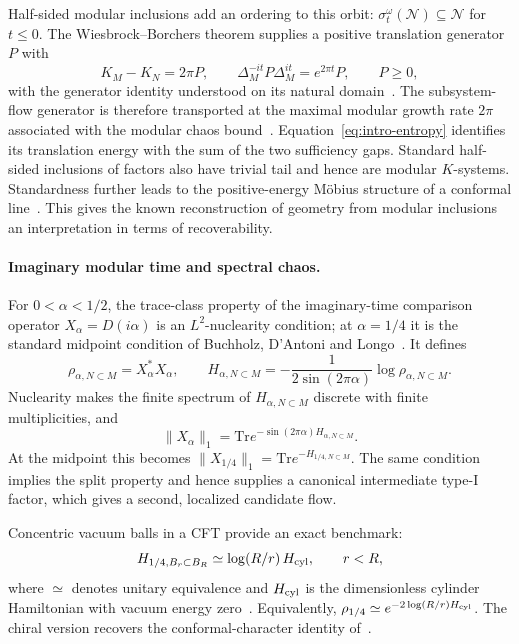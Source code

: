\documentclass[a4paper,11pt]{article}
\theoremstyle{definition}
\newcommand{\Tr}{\text{Tr}}
\begin{document}
Half-sided modular inclusions add an ordering to this orbit: $\sigma_t^\omega(\mathcal N)\subseteq\mathcal N$ for $t\le0$. The Wiesbrock--Borchers theorem supplies a positive translation generator $P$ with
\begin{equation}
 K_M-K_N=2\pi P,
 \qquad
 \Delta_M^{-it}P\Delta_M^{it}=e^{2\pi t}P,
 \qquad P\ge0,
\end{equation}
with the generator identity understood on its natural domain~\cite{Wiesbrock1993,Borchers1992,ArakiZsido2005}. The subsystem-flow generator is therefore transported at the maximal modular growth rate $2\pi$ associated with the modular chaos bound~\cite{deBoerLamprou2020}. Equation~\eqref{eq:intro-entropy} identifies its translation energy with the sum of the two sufficiency gaps. Standard half-sided inclusions of factors also have trivial tail and hence are modular $K$-systems. Standardness further leads to the positive-energy M\"obius structure of a conformal line~\cite{Wiesbrock1993b,GuidoLongoWiesbrock1998}. This gives the known reconstruction of geometry from modular inclusions an interpretation in terms of recoverability.

\paragraph{Imaginary modular time and spectral chaos.}
For $0<\alpha<1/2$, the trace-class property of the imaginary-time comparison operator $X_\alpha=D(i\alpha)$ is an $L^2$-nuclearity condition; at $\alpha=1/4$ it is the standard midpoint condition of Buchholz, D'Antoni and Longo~\cite{BDL2007}. It defines
\begin{equation}
 \rho_{\alpha,N\subset M}=X_\alpha^*X_\alpha,
 \qquad
 H_{\alpha,N\subset M}
 =-\frac{1}{2\sin(2\pi\alpha)}\log\rho_{\alpha,N\subset M}.
\end{equation}
Nuclearity makes the finite spectrum of $H_{\alpha,N\subset M}$ discrete with finite multiplicities, and
\begin{equation}
 \|X_\alpha\|_1
 =\Tr e^{-\sin(2\pi\alpha)H_{\alpha,N\subset M}}.
\end{equation}
At the midpoint this becomes $\|X_{1/4}\|_1=\Tr e^{-H_{1/4,N\subset M}}$. The same condition implies the split property and hence supplies a canonical intermediate type-I factor, which gives a second, localized candidate flow.

Concentric vacuum balls in a CFT provide an exact benchmark:
\begin{equation}
 H_{1/4,B_r\subset B_R}\simeq\log(R/r)\,H_{\rm cyl},
 \qquad r<R,
\end{equation}
where $\simeq$ denotes unitary equivalence and $H_{\rm cyl}$ is the dimensionless cylinder Hamiltonian with vacuum energy zero~\cite{companionQFT}. Equivalently, $\rho_{1/4}\simeq e^{-2\log(R/r)H_{\rm cyl}}$. The chiral version recovers the conformal-character identity of~\cite{BDL2007}.
\end{document}
